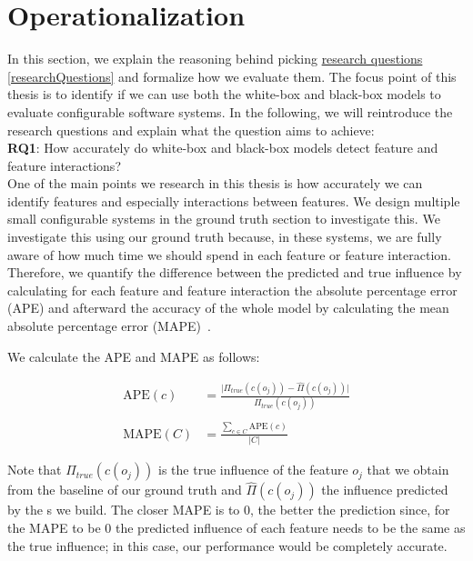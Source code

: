 \section{Operationalization}\label{ch:operationalization}

In this section, we explain the reasoning behind picking \hyperref[researchQuestions]{research questions \ref*{researchQuestions}} 
and formalize how we evaluate them. The focus point of this thesis is to identify if we can use both the white-box and black-box models 
to evaluate configurable software systems. In the following, we will reintroduce the research questions and explain what the question aims to achieve:\\

\noindent \textbf{RQ1}: How accurately do white-box and black-box models detect feature and feature interactions? \\

One of the main points we research in this thesis is how accurately we can identify features and especially interactions between features. 
We design multiple small configurable systems in the ground truth section to investigate this. 
We investigate this using our ground truth because, in these systems, 
we are fully aware of how much time we should spend in each feature or feature interaction. 
Therefore, we quantify the difference between the predicted and true influence by calculating for each feature and 
feature interaction the absolute percentage error (APE) and afterward the accuracy of the whole model by calculating the mean absolute percentage error 
(MAPE)~\cite{mape}. %

We calculate the APE and MAPE as follows:

\begin{align}
    \text{APE}(c) &= \frac{\lvert \Pi_{true}(c(o_j)) - \widehat{\Pi}(c(o_j))\rvert}{\Pi_{true}(c(o_j))} \label{equ:APE} \\ \nonumber \\
    \text{MAPE}(C) &= \frac{\sum_{c \in C} \text{APE}(c)}{\lvert C \rvert} \label{equ:mape}
\end{align}

Note that $\Pi_{true}(c(o_j))$ is the true influence of the feature $o_j$ that we obtain from the baseline of our ground truth 
and $\widehat{\Pi}(c(o_j))$ the influence predicted by the {\perfInfluenceModel}s we build.
The closer MAPE is to $0$, the better the prediction since, 
for the MAPE to be $0$ the predicted influence of each feature needs to be the same as the true influence; 
in this case, our performance would be completely accurate. \\

